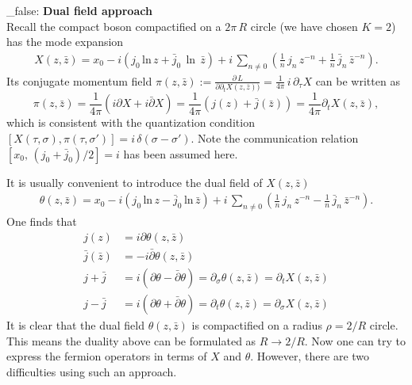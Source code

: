 \documentclass[submission, PhysLectNotes]{SciPost}
\begin{document}
\if_false:
{\bf Dual field approach}\\
Recall the compact boson compactified on a $2\pi\,R$ circle (we have chosen $K=2$) has the mode expansion
\begin{equation}
	\begin{split}
		X(z,\bar{z}) = x_0 -i\left(j_0\,\mathrm{ln}\,z + \bar{j}_0\,\ln\,\bar{z}\right) + i\,\sum_{n\neq0} \left(\frac{1}{n}\,j_n\,z^{-n}+\frac{1}{n}\,\bar{j}_n\,\bar{z}^{-n}\right).
	\end{split}
\end{equation} 
Its conjugate momentum field $\pi(z,\bar{z}):=\frac{\partial\,L}{\partial\partial_tX(z,\bar{z}))} = \frac{1}{4\pi}\,i\,\partial_\tau X$ can be written as
\begin{equation}
	\pi(z,\bar{z}) = \frac{1}{4\pi} \left(i\partial X + i\bar{\partial} X\right) = \frac{1}{4\pi} \left(j(z) + \bar{j}(\bar{z})\right) = \frac{1}{4\pi} \partial_t X(z,\bar{z}),
\end{equation}
which is consistent with the quantization condition $[X(\tau,\sigma),\pi (\tau,\sigma')] = i\,\delta(\sigma-\sigma')$. Note the communication relation $[x_0,\,\left(j_0+\bar{j}_0\right)/2] = i$ has been assumed here. 

It is usually convenient to introduce the dual field of $X(z,\bar{z})$
\begin{equation}
	\begin{split}
		\theta(z,\bar{z}) = x_0 -i\left(j_0\,\mathrm{ln}\,z - \bar{j}_0\,\mathrm{ln}\,\bar{z}\right) + i\,\sum_{n\neq0} \left(\frac{1}{n}\,j_n\,z^{-n}-\frac{1}{n}\,\bar{j}_n\,\bar{z}^{-n}\right).
	\end{split}
\end{equation} 
One finds that 
\begin{equation}
	\begin{split}
		j(z) &= i\partial\theta(z,\bar{z}) \\
		\bar{j}(\bar{z}) &= -i\bar{\partial}\theta(z,\bar{z})\\
		j+\bar{j} &= i\left(\partial\theta-\bar{\partial}\theta\right) = \partial_\sigma \theta(z,\bar{z}) = \partial_t X(z,\bar{z}) \\
		j-\bar{j} &= i\left(\partial\theta+\bar{\partial}\theta\right) = \partial_t \theta(z,\bar{z}) = \partial_\sigma X(z,\bar{z})
	\end{split}
\end{equation}
It is clear that the dual field $\theta(z,\bar{z})$ is compactified on a radius $\rho = 2/R$ circle. This means the duality above can be formulated as $R \rightarrow 2/R$. Now one can try to express the fermion operators in terms of $X$ and $\theta$. However, there are two difficulties using such an approach. 
\end{document}
